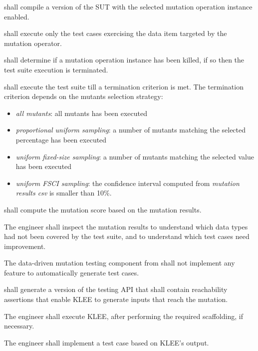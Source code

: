 \RQ{} \FAQAS shall compile a version of the SUT with the selected mutation operation instance enabled.

\RQ{} \FAQAS shall execute only the test cases exercising the data item targeted by the mutation operator.

\RQ{} \FAQAS shall determine if a mutation operation instance has been killed, if so then the test suite execution is terminated.

\RQ{} \FAQAS shall execute the test suite till a termination criterion is met. The termination criterion depends on the mutants selection strategy:
\begin{itemize}
\item \emph{all mutants}: all mutants has been executed
\item \emph{proportional uniform sampling}: a number of mutants matching the selected percentage has been executed
\item \emph{uniform fixed-size sampling}: a number of mutants matching the selected value has been executed
\item \emph{uniform FSCI sampling}: the confidence interval computed from \emph{mutation results csv} is smaller than 10\%.
\end{itemize}

\RQ{} \FAQAS shall compute the mutation score based on the mutation results.

\RQ{} The engineer shall inspect the mutation results to understand which data types had not been covered by the test suite, and to understand which test cases need improvement.

\RQ{} The data-driven mutation testing component from \FAQAS shall not implement any feature to automatically generate test cases. 

\RQ{} \FAQAS shall generate a version of the testing API that shall contain reachability assertions that enable KLEE to generate inputs that reach the mutation.

\RQ{} The engineer shall execute KLEE, after performing the required scaffolding, if necessary. 

\RQ{} The engineer shall implement a test case based on KLEE's output.